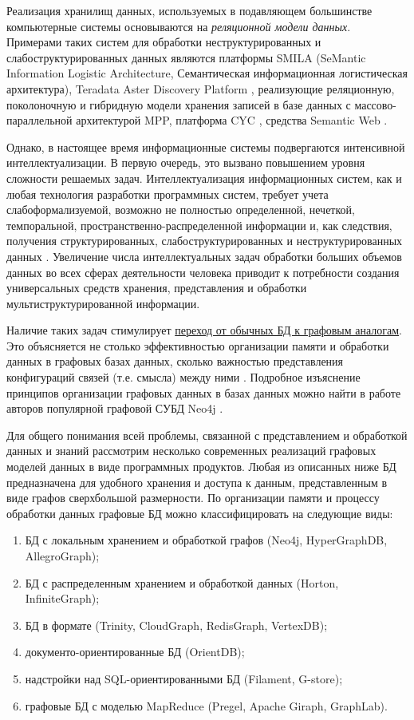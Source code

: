 \bigskip

Реализация хранилищ данных, используемых в подавляющем большинстве компьютерные системы основываются на \textit{реляционной модели данных}. Примерами таких систем для обработки неструктурированных и слабоструктурированных данных являются платформы SMILA (SeMantic Information Logistic Architecture, Семантическая информационная логистическая архитектура), Teradata Aster Discovery Platform \cite{ballinger2009teradata}, реализующие реляционную, поколоночную и гибридную модели хранения записей в базе данных с массово-параллельной архитектурой MPP, платформа CYC \cite{CycPlatform2022}, средства Semantic Web \cite{sem_web}.

Однако, в настоящее время информационные системы подвергаются интенсивной интеллектуализации. В первую очередь, это вызвано повышением уровня сложности решаемых задач. Интеллектуализация информационных систем, как и любая технология разработки программных систем, требует учета слабоформализуемой, возможно не полностью определенной, нечеткой, темпоральной, пространственно-распределенной информации и, как следствия, получения структурированных, слабоструктурированных и неструктурированных данных \cite{Rudikova2018}. Увеличение числа интеллектуальных задач обработки больших объемов данных во всех сферах деятельности человека приводит к потребности создания универсальных средств хранения, представления и обработки мультиструктурированной информации.

Наличие таких задач стимулирует \underline{переход от обычных БД к графовым аналогам}. Это объясняется не столько эффективностью организации памяти и обработки данных в графовых базах данных, сколько важностью представления конфигураций связей (т.е. смысла) между ними . Подробное изъяснение принципов организации графовых данных в базах данных можно найти в работе авторов популярной графовой СУБД Neo4j \cite{GDB}.

Для общего понимания всей проблемы, связанной с представлением и обработкой данных и знаний рассмотрим несколько современных реализаций графовых моделей данных в виде программных продуктов. Любая из описанных ниже БД предназначена для удобного хранения и доступа к данным, представленным в виде графов сверхбольшой размерности. По организации памяти и процессу обработки данных графовые БД можно классифицировать на следующие виды:
\begin{enumerate}
    \item БД с локальным хранением и обработкой графов (Neo4j, HyperGraphDB, AllegroGraph);
    \item БД с распределенным хранением и обработкой данных (Horton, InfiniteGraph);
    \item БД в формате  (Trinity, CloudGraph, RedisGraph, VertexDB);
    \item документо-ориентированные БД (OrientDB);
    \item надстройки над SQL-ориентированными БД (Filament, G-store);
    \item графовые БД с моделью MapReduce (Pregel, Apache Giraph, GraphLab).
\end{enumerate}


